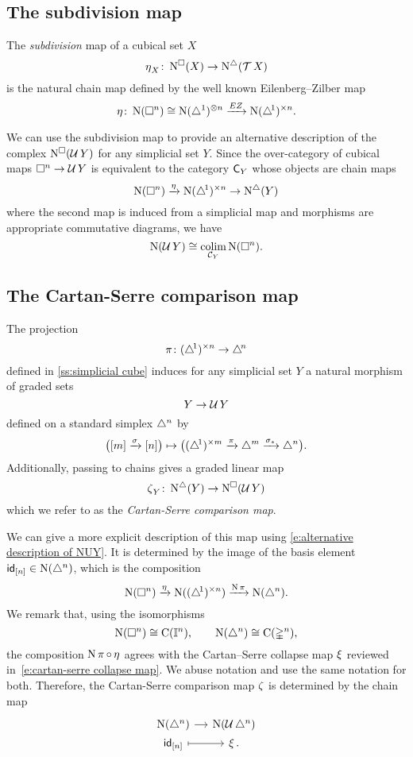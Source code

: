 \subsection{The subdivision map}

The \textit{subdivision} map of a cubical set $X$
\[
\operatorname{\eta}_X \colon \operatorname{N^{\square}}(X) \to \operatorname{N^{\triangle}}(\operatorname{\mathcal{T}} X)
\]
is the natural chain map defined by the well known Eilenberg--Zilber map
\[
\operatorname{\eta} \colon \operatorname{N}(\square^n) \cong \operatorname{N}(\triangle^1)^{\otimes n} \xrightarrow{EZ} \operatorname{N} (\triangle^{\!1})^{\times n}.
\]

We can use the subdivision map to provide an alternative description of the complex $\operatorname{N^{\square}}(\operatorname{\mathcal{U}} Y)$ for any simplicial set $Y$.
Since the over-category of cubical maps $\square^n \to \operatorname{\mathcal{U}} Y$ is equivalent to the category $\mathsf{C}_Y$ whose objects are chain maps
\[
\operatorname{N}(\square^n) \xrightarrow{\operatorname{\eta}} \operatorname{N} (\triangle^{\!1})^{\times n} \to \operatorname{N^{\triangle}}(Y)
\]
where the second map is induced from a simplicial map
and morphisms are appropriate commutative diagrams, we have
\begin{equation} \label{e:alternative description of NUY}
\operatorname{N}(\operatorname{\mathcal{U}} Y) \cong \operatorname*{colim}_{\mathcal{C}_Y} \operatorname{N}(\square^n).
\end{equation}

\subsection{The Cartan-Serre comparison map} \label{ss:comparison map}

The projection
\[
\operatorname{\pi} \colon (\triangle^{\!1})^{\times n} \to \triangle^{\!n}
\]
defined in \cref{ss:simplicial cube} induces for any simplicial set $Y$ a natural morphism of graded sets
\[
Y \to \operatorname{\mathcal{U}} Y
\]
defined on a standard simplex $\triangle^n$ by
\[
\big( [m] \xrightarrow{\sigma} [n] \big) \mapsto
\big( (\triangle^{\!1})^{\times m} \xrightarrow{\operatorname{\pi}} \triangle^m \xrightarrow{\sigma_\ast} \triangle^n \big).
\]
Additionally, passing to chains gives a graded linear map
\[
\operatorname{\zeta}_Y \colon \operatorname{N^{\triangle}}(Y) \to \operatorname{N^{\square}}(\operatorname{\mathcal{U}} Y)
\]
which we refer to as the \textit{Cartan-Serre comparison map}.

We can give a more explicit description of this map using \eqref{e:alternative description of NUY}.
It is determined by the image of the basis element $\mathsf{id}_{[n]} \in \operatorname{N}(\triangle^n)$, which is the composition
\[
\operatorname{N}(\square^n) \xrightarrow{\operatorname{\eta}} \operatorname{N}((\triangle^{\!1})^{\times n}) \xrightarrow{\operatorname{N} \operatorname{\pi}} \operatorname{N}(\triangle^n).
\]
We remark that, using the isomorphisms
\[
\operatorname{N}(\square^n) \cong \operatorname{C}(\mathbb{I}^n), \qquad
\operatorname{N}(\triangle^n) \cong \operatorname{C}(\mathbb{\Delta}^n),
\]
the composition $\operatorname{N} \operatorname{\pi} \circ \operatorname{\eta}$ agrees with the Cartan--Serre collapse map $\operatorname{\xi}$ reviewed in~\eqref{e:cartan-serre collapse map}.
We abuse notation and use the same notation for both.
Therefore, the Cartan-Serre comparison map $\operatorname{\zeta}$ is determined by the chain map
\[
\begin{tikzcd}[column sep=small, row sep=0]
\chains(\simplex^n) \arrow[r] &
\chains(\cubify \simplex^n) \\
\id_{[n]} \arrow[r, mapsto] &
\CScollapse.
\end{tikzcd}
\]

